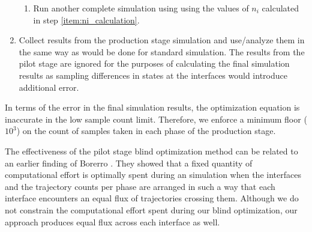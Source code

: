 \begin{enumerate}
\begin{enumerate}
            \item Run another complete  simulation using using the values of $n_i$ calculated in step \ref{item:ni_calculation}.
        \end{enumerate}
    \item Collect results from the production stage simulation and use/analyze them in the same way as would be done for standard  simulation. The results from the pilot stage are ignored for the purposes of calculating the final simulation results as sampling differences in states at the interfaces would introduce additional error. 
\end{enumerate}

In terms of the error in the final simulation results, the optimization equation is inaccurate in the low sample count limit. Therefore, we enforce a minimum floor ($10^3$) on the count of samples taken in each phase of the production stage.

The effectiveness of the pilot stage blind optimization method can be related to an earlier finding of Borerro {\etal}\supercite{Borrero:2008il}. They showed that a fixed quantity of computational effort is optimally spent during an  simulation when the interfaces and the trajectory counts per phase are arranged in such a way that each interface encounters an equal flux of trajectories crossing them. Although we do not constrain the computational effort spent during our blind optimization, our approach produces equal flux across each interface as well.

